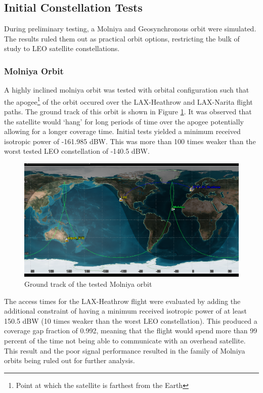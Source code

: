 \subsection{Initial Constellation Tests} \label{sec:initial_constel}
During preliminary testing, a Molniya and Geosynchronous orbit were simulated. The results ruled them out as practical orbit options, restricting the bulk of study to LEO satellite constellations.
\subsubsection{Molniya Orbit}
A highly inclined molniya orbit was tested with orbital configuration such that the apogee\footnote{Point at which the satellite is farthest from the Earth} of the orbit occured over the LAX-Heathrow and LAX-Narita flight paths. The ground track of this orbit is shown in Figure \ref{fig:molniya}. It was observed that the satellite would `hang' for long periods of time over the apogee potentially allowing for a longer coverage time. Initial tests yielded a minimum received isotropic power of -161.985 dBW. This was more than 100 times weaker than the worst tested LEO constellation of -140.5 dBW.

\begin{figure}[H]
	\centering
	\includegraphics[scale = 0.50]{Pictures/molniya.png}
	
	\caption{Ground track of the tested Molniya orbit}
	\label{fig:molniya}
\end{figure} 

The access times for the LAX-Heathrow flight were evaluated by adding the additional constraint of having a minimum received isotropic power of at least 150.5 dBW (10 times weaker than the worst LEO constellation). This produced a coverage gap fraction of 0.992, meaning that the flight would spend more than 99 percent of the time not being able to communicate with an overhead satellite. This result and the poor signal performance resulted in the family of Molniya orbits being ruled out for further analysis.


